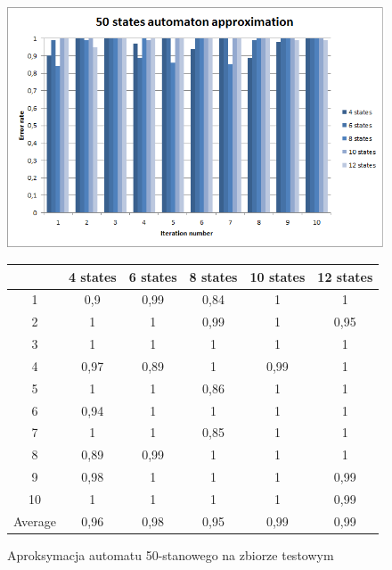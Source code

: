 \documentclass[runningheads,a4paper]{llncs}
\begin{document}
\begin{figure}[!htb]
\includegraphics[scale=0.92]{4.png}
\endminipage\hfill
\hspace{2.2cm}
\renewcommand{\arraystretch}{1.3}%
\begin{tabular}{@{}cccccc@{}}
\toprule
        & 4 states & 6 states & 8 states & 10 states & 12 states    \\ \midrule
1       & 0,9      & 0,99     & 0,84     & 1         & 1 \\
2       & 1        & 1        & 0,99     & 1         & 0,95 \\
3       & 1        & 1        & 1        & 1         & 1 \\
4       & 0,97     & 0,89     & 1        & 0,99      & 1   \\
5       & 1        & 1        & 0,86     & 1         & 1   \\
6       & 0,94     & 1        & 1        & 1         & 1    \\
7       & 1        & 1        & 0,85     & 1         & 1    \\
8       & 0,89     & 0,99     & 1        & 1         & 1     \\
9       & 0,98     & 1        & 1        & 1         & 0,99 \\
10      & 1        & 1        & 1        & 1         & 0,99  \\ \bottomrule
Average & 0,96    & 0,98    & 0,95    & 0,99     & 0,99  \\ \bottomrule
\end{tabular}
\vspace{4mm}
\endminipage\hfill
\caption{Aproksymacja automatu 50-stanowego na zbiorze testowym}
\end{figure}
\end{document}
